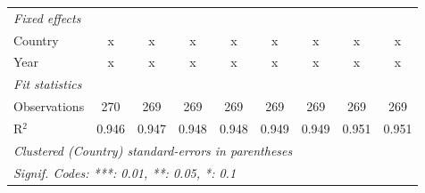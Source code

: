 \begin{table}[htbp]
\begin{tabular}{lcccccccc}
      \emph{Fixed effects}\\
      Country                                   & x              & x              & x             & x             & x              & x              & x              & x\\  
      Year                                      & x              & x              & x             & x             & x              & x              & x              & x\\  
      \midrule \emph{Fit statistics}\\
      Observations                              & 270            & 269            & 269           & 269           & 269            & 269            & 269            & 269\\  
      R$^2$                                     & 0.946          & 0.947          & 0.948         & 0.948         & 0.949          & 0.949          & 0.951          & 0.951\\  
      \midrule
      \multicolumn{9}{l}{\emph{Clustered (Country) standard-errors in parentheses}}\\
      \multicolumn{9}{l}{\emph{Signif. Codes: ***: 0.01, **: 0.05, *: 0.1}}\\
   \end{tabular}
\end{table}


